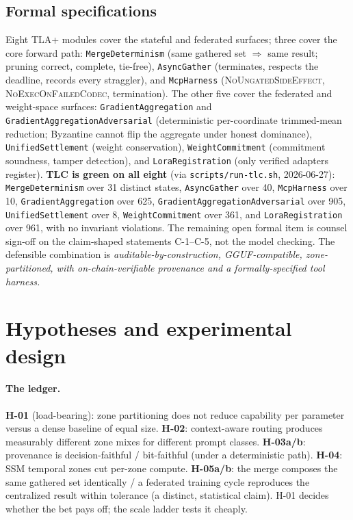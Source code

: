 \documentclass[11pt]{article}
\begin{document}
\subsection{Formal specifications}
Eight TLA+ modules \citep{lamport2002specifying} cover the stateful and federated surfaces; three cover the core forward path: \texttt{MergeDeterminism} (same gathered set
$\Rightarrow$ same result; pruning correct, complete, tie-free), \texttt{AsyncGather} (terminates,
respects the deadline, records every straggler), and \texttt{McpHarness}
(\textsc{NoUngatedSideEffect}, \textsc{NoExecOnFailedCodec}, termination). The other five cover the federated and weight-space surfaces: \texttt{GradientAggregation} and \texttt{GradientAggregationAdversarial} (deterministic per-coordinate trimmed-mean reduction; Byzantine cannot flip the aggregate under honest dominance), \texttt{UnifiedSettlement} (weight conservation), \texttt{WeightCommitment} (commitment soundness, tamper detection), and \texttt{LoraRegistration} (only verified adapters register). \textbf{TLC is green on all
eight} (via \texttt{scripts/run-tlc.sh}, 2026-06-27): \texttt{MergeDeterminism} over 31 distinct states,
\texttt{AsyncGather} over 40, \texttt{McpHarness} over 10, \texttt{GradientAggregation} over 625, \texttt{GradientAggregationAdversarial} over 905, \texttt{UnifiedSettlement} over 8, \texttt{WeightCommitment} over 361, and \texttt{LoraRegistration} over 961, with no invariant violations. The remaining
open formal item is counsel sign-off on the claim-shaped statements C-1--C-5, not the model checking.
The defensible combination is \emph{auditable-by-construction, GGUF-compatible, zone-partitioned, with
on-chain-verifiable provenance and a formally-specified tool harness.}

\section{Hypotheses and experimental design}\label{sec:hyp}

\paragraph{The ledger.}
\textbf{H-01} (load-bearing): zone partitioning does not reduce capability per parameter versus a
dense baseline of equal size. \textbf{H-02}: context-aware routing produces measurably different zone
mixes for different prompt classes. \textbf{H-03a/b}: provenance is decision-faithful / bit-faithful
(under a deterministic path). \textbf{H-04}: SSM temporal zones cut per-zone compute. \textbf{H-05a/b}:
the merge composes the same gathered set identically / a federated training cycle reproduces the
centralized result within tolerance (a distinct, statistical claim). H-01 decides whether the bet
pays off; the scale ladder tests it cheaply.
\end{document}
